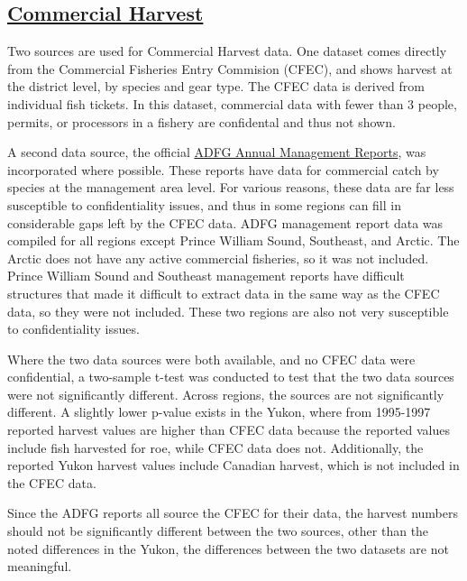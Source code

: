 \documentclass[]{article}
\begin{document}
\hypertarget{commercial-harvest}{%
\subsection{\texorpdfstring{\href{https://knb.ecoinformatics.org/\#view/urn:uuid:40473bde-9774-4581-aafb-5d2c3b4a70d1}{Commercial
Harvest}}{Commercial Harvest}}\label{commercial-harvest}}

Two sources are used for Commercial Harvest data. One dataset comes
directly from the Commercial Fisheries Entry Commision (CFEC), and shows
harvest at the district level, by species and gear type. The CFEC data
is derived from individual fish tickets. In this dataset, commercial
data with fewer than 3 people, permits, or processors in a fishery are
confidental and thus not shown.

A second data source, the official
\href{https://knb.ecoinformatics.org/\#view/urn:uuid:31b421f3-c48c-473a-bc20-601c738b3a3c}{ADFG
Annual Management Reports}, was incorporated where possible. These
reports have data for commercial catch by species at the management area
level. For various reasons, these data are far less susceptible to
confidentiality issues, and thus in some regions can fill in
considerable gaps left by the CFEC data. ADFG management report data was
compiled for all regions except Prince William Sound, Southeast, and
Arctic. The Arctic does not have any active commercial fisheries, so it
was not included. Prince William Sound and Southeast management reports
have difficult structures that made it difficult to extract data in the
same way as the CFEC data, so they were not included. These two regions
are also not very susceptible to confidentiality issues.

Where the two data sources were both available, and no CFEC data were
confidential, a two-sample t-test was conducted to test that the two
data sources were not significantly different. Across regions, the
sources are not significantly different. A slightly lower p-value exists
in the Yukon, where from 1995-1997 reported harvest values are higher
than CFEC data because the reported values include fish harvested for
roe, while CFEC data does not. Additionally, the reported Yukon harvest
values include Canadian harvest, which is not included in the CFEC data.

Since the ADFG reports all source the CFEC for their data, the harvest
numbers should not be significantly different between the two sources,
other than the noted differences in the Yukon, the differences between
the two datasets are not meaningful.
\end{document}

